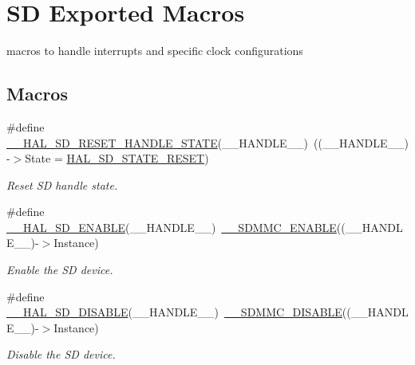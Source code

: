 \hypertarget{group___s_d___exported__macros}{}\section{SD Exported Macros}
\label{group___s_d___exported__macros}


macros to handle interrupts and specific clock configurations  


\subsection*{Macros}
\begin{DoxyCompactItemize}
\item 
\#define \mbox{\hyperlink{group___s_d___exported__macros_ga2a5557d59e36f15d84d41a4cd3832984}{\+\_\+\+\_\+\+H\+A\+L\+\_\+\+S\+D\+\_\+\+R\+E\+S\+E\+T\+\_\+\+H\+A\+N\+D\+L\+E\+\_\+\+S\+T\+A\+TE}}(\+\_\+\+\_\+\+H\+A\+N\+D\+L\+E\+\_\+\+\_\+)~((\+\_\+\+\_\+\+H\+A\+N\+D\+L\+E\+\_\+\+\_\+)-\/$>$State = \mbox{\hyperlink{group___s_d___exported___types___group1_gga0012126bcdfea270fe367bfaec2692baaa6dd140391c3c9377280e2f262b24343}{H\+A\+L\+\_\+\+S\+D\+\_\+\+S\+T\+A\+T\+E\+\_\+\+R\+E\+S\+ET}})
\begin{DoxyCompactList}\small\item\em Reset SD handle state. \end{DoxyCompactList}\item 
\#define \mbox{\hyperlink{group___s_d___exported__macros_ga0c4d9ae5d5b41bae000b7911ed510223}{\+\_\+\+\_\+\+H\+A\+L\+\_\+\+S\+D\+\_\+\+E\+N\+A\+B\+LE}}(\+\_\+\+\_\+\+H\+A\+N\+D\+L\+E\+\_\+\+\_\+)~\mbox{\hyperlink{group___s_d_m_m_c___l_l___interrupt___clock_ga20f2287a3097b96bd7e020919a4d0057}{\+\_\+\+\_\+\+S\+D\+M\+M\+C\+\_\+\+E\+N\+A\+B\+LE}}((\+\_\+\+\_\+\+H\+A\+N\+D\+L\+E\+\_\+\+\_\+)-\/$>$Instance)
\begin{DoxyCompactList}\small\item\em Enable the SD device. \end{DoxyCompactList}\item 
\#define \mbox{\hyperlink{group___s_d___exported__macros_ga3d6615771e538261189c0a6dd1ef5d47}{\+\_\+\+\_\+\+H\+A\+L\+\_\+\+S\+D\+\_\+\+D\+I\+S\+A\+B\+LE}}(\+\_\+\+\_\+\+H\+A\+N\+D\+L\+E\+\_\+\+\_\+)~\mbox{\hyperlink{group___s_d_m_m_c___l_l___interrupt___clock_gaf3ddbea0ba674cf1bc84fc1a4558840b}{\+\_\+\+\_\+\+S\+D\+M\+M\+C\+\_\+\+D\+I\+S\+A\+B\+LE}}((\+\_\+\+\_\+\+H\+A\+N\+D\+L\+E\+\_\+\+\_\+)-\/$>$Instance)
\begin{DoxyCompactList}\small\item\em Disable the SD device. \end{DoxyCompactList}\item 

\end{DoxyCompactItemize}
